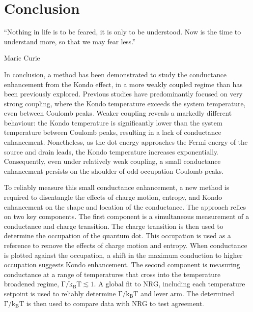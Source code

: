 \chapter{Conclusion}\label{cha:conclusion}


\epigraph{``Nothing in life is to be feared, it is only to be understood. Now is the time to understand more, so that we may fear less.''}{Marie Curie}

\noindent In conclusion, a method has been demonstrated to study the conductance enhancement from the Kondo effect, in a more weakly coupled regime than has been previously explored. 
Previous studies have predominantly focused on very strong coupling, where the Kondo temperature exceeds the system temperature, even between Coulomb peaks.
Weaker coupling reveals a markedly different behaviour: the Kondo temperature is significantly lower than the system temperature between Coulomb peaks, resulting in a lack of conductance enhancement.
Nonetheless, as the dot energy approaches the Fermi energy of the source and drain leads, the Kondo temperature increases exponentially. 
Consequently, even under relatively weak coupling, a small conductance enhancement persists on the shoulder of odd occupation Coulomb peaks.




To reliably measure this small conductance enhancement, a new method is required to disentangle the effects of charge motion, entropy, and Kondo enhancement on the shape and location of the conductance. 
The approach relies on two key components. 
The first component is a simultaneous measurement of a conductance and charge transition. The charge transition is then used to determine the occupation of the quantum dot. This occupation is used as a reference to remove the effects of charge motion and entropy. When conductance is plotted against the occupation, a shift in the maximum conduction to higher occupation suggests Kondo enhancement. 
The second component is measuring conductance at a range of temperatures that cross into the temperature broadened regime, $\mathrm{\Gamma/k_BT} \lesssim 1$. A global fit to NRG, including each temperature setpoint is used to reliably determine $\mathrm{\Gamma/k_BT}$ and lever arm. The determined $\mathrm{\Gamma/k_BT}$ is then used to compare data with NRG to test agreement. 

